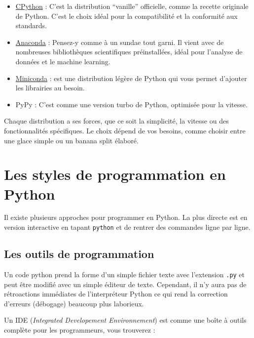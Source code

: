 \documentclass[
  11pt,
  letterpaper,
  open=any,
  twoside=false,
  french]{scrbook}
\begin{document}
\begin{itemize}
\item
  \href{https://www.python.org/downloads/}{CPython} : C'est la
  distribution ``vanille'' officielle, comme la recette originale de
  Python. C'est le choix idéal pour la compatibilité et la conformité
  aux standards.
\item
  \href{https://www.anaconda.com/download}{Anaconda} : Pensez-y comme à
  un sundae tout garni. Il vient avec de nombreuses bibliothèques
  scientifiques préinstallées, idéal pour l'analyse de données et le
  machine learning.
\item
  \href{https://docs.anaconda.com/miniconda/miniconda-install/}{Miniconda}
  : est une distribution légère de Python qui vous permet d'ajouter les
  librairies au besoin.
\item
  PyPy : C'est comme une version turbo de Python, optimisée pour la
  vitesse.
\end{itemize}

Chaque distribution a ses forces, que ce soit la simplicité, la vitesse
ou des fonctionnalités spécifiques. Le choix dépend de vos besoins,
comme choisir entre une glace simple ou un banana split élaboré.

\section{Les styles de programmation en
Python}\label{les-styles-de-programmation-en-python}

Il existe plusieurs approches pour programmer en Python. La plus directe
est en version interactive en tapant \texttt{python} et de rentrer des
commandes ligne par ligne.

\subsection{Les outils de
programmation}\label{les-outils-de-programmation}

Un code python prend la forme d'un simple fichier texte avec l'extension
\texttt{.py} et peut être modifié avec un simple éditeur de texte.
Cependant, il n'y aura pas de rétroactions immédiates de l'interpréteur
Python ce qui rend la correction d'erreurs (débogage) beaucoup plus
laborieux.

Un IDE (\emph{Integrated Developement Environnement}) est comme une
boîte à outils complète pour les programmeurs, vous trouverez :
\end{document}

